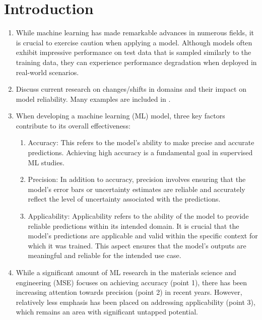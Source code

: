 \section{Introduction}

\begin{enumerate}

    \item While machine learning has made remarkable advances in numerous fields, it is crucial to exercise caution when applying a model. Although models often exhibit impressive performance on test data that is sampled similarly to the training data, they can experience performance degradation when deployed in real-world scenarios.
    
    \item Discuss current research on changes/shifts in domains and their impact on model reliability. Many examples are included in \cite{Koh2020}.

    \item When developing a machine learning (ML) model, three key factors contribute to its overall effectiveness:

    \begin{enumerate}
        \item Accuracy: This refers to the model's ability to make precise and accurate predictions. Achieving high accuracy is a fundamental goal in supervised ML studies.
        \item Precision: In addition to accuracy, precision involves ensuring that the model's error bars or uncertainty estimates are reliable and accurately reflect the level of uncertainty associated with the predictions.
        \item Applicability: Applicability refers to the ability of the model to provide reliable predictions within its intended domain. It is crucial that the model's predictions are applicable and valid within the specific context for which it was trained. This aspect ensures that the model's outputs are meaningful and reliable for the intended use case.
    \end{enumerate}

    \item While a significant amount of ML research in the materials science and engineering (MSE) focuses on achieving accuracy (point 1), there has been increasing attention towards precision (point 2) in recent years. However, relatively less emphasis has been placed on addressing applicability (point 3), which remains an area with significant untapped potential.


\end{enumerate}

